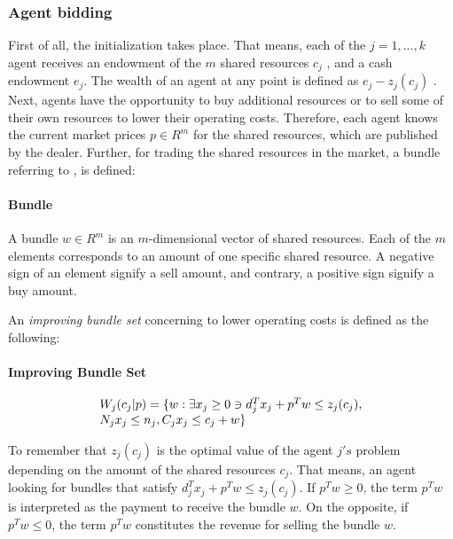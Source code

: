 \subsubsection{Agent bidding}
\label{sec:agent_bidding}
First of all, the initialization takes place. That means, each of the $j=1, ..., k$ agent receives an
endowment of the $m$ shared resources $c_{j}$ , and a cash endowment $e_{j}$.
The wealth of an agent at any point is defined as $e_{j} - z_{j}(c_{j})$ .
Next, agents have the opportunity to buy additional resources or to sell some of their own resources 
to lower their operating costs. 
Therefore, each agent knows the current market prices $p \in R^{m}$ for the shared resources, 
which are published by the dealer. Further, for trading the shared resources in the market, 
a bundle referring to , is defined:

\paragraph*{Bundle} A bundle $w \in R^{m}$ is an $m$-dimensional vector of shared resources. 
Each of the $m$ elements corresponds to an amount of one specific shared resource. 
A negative sign of an element signify a sell amount, 
and contrary, a positive sign signify a buy amount. \newline


An \textit{improving bundle set} concerning to lower operating costs is defined as the following:

\paragraph*{Improving Bundle Set}
\begin{equation}
    \begin{array}{ll@{}ll}
        W_{j}(c_{j}|p) = \{w: \exists x_{j} \geq 0 \ni d_{j}^{T}x_{j} + p^{T}w \leq z_{j}(c_{j}), \\
        N_{j}x_{j} \leq n_{j}, C_{j}x_{j} \leq c_{j}+w \}
    \end{array}
\end{equation}

To remember that $z_{j}(c_{j})$ is the optimal value of the agent $j's$ problem 
depending on the amount of the shared resources $c_{j}$. 
That means, an agent looking for bundles that satisfy 
$d_{j}^{T}x_{j} + p^{T}w \leq z_{j}(c_{j})$. If 
$p^{T}w \geq 0$, the term $p^{T}w$ is interpreted as the payment to receive the bundle $w$.
On the opposite, if $p^{T}w \leq 0$, the term $p^{T}w$ constitutes the revenue for selling the bundle $w$.


